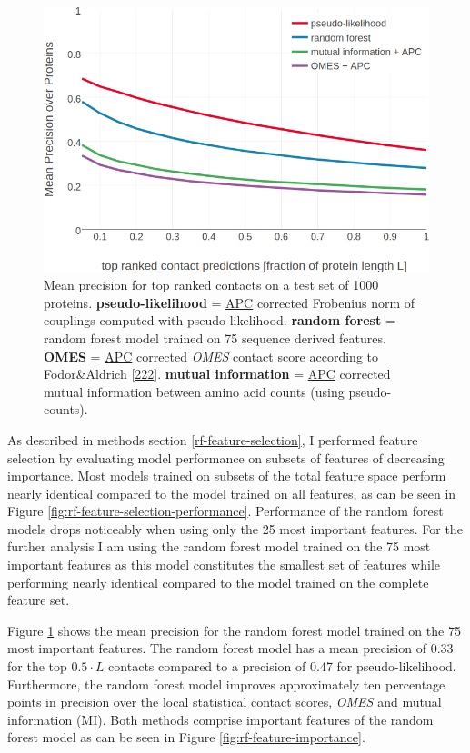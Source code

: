 \documentclass[11pt,a4paper,twoside]{book}
\theoremstyle{definition}
\theoremstyle{definition}
\theoremstyle{remark}
\begin{document}
\begin{figure}
\includegraphics[width=0.9\linewidth]{img/random_forest_contact_prior/precision_vs_rank_notitle} \caption{Mean precision for top ranked contacts on a
test set of 1000 proteins. \textbf{pseudo-likelihood} =
\protect\hyperlink{abbrev}{APC} corrected Frobenius norm of couplings
computed with pseudo-likelihood. \textbf{random forest} = random forest
model trained on 75 sequence derived features. \textbf{OMES} =
\protect\hyperlink{abbrev}{APC} corrected \emph{OMES} contact score
according to Fodor\&Aldrich
{[}\protect\hyperlink{ref-Fodor2004a}{222}{]}. \textbf{mutual
information} = \protect\hyperlink{abbrev}{APC} corrected mutual
information between amino acid counts (using pseudo-counts).}\label{fig:performance-rf}
\end{figure}

As described in methods section \ref{rf-feature-selection}, I performed
feature selection by evaluating model performance on subsets of features
of decreasing importance. Most models trained on subsets of the total
feature space perform nearly identical compared to the model trained on
all features, as can be seen in Figure
\ref{fig:rf-feature-selection-performance}. Performance of the random
forest models drops noticeably when using only the 25 most important
features. For the further analysis I am using the random forest model
trained on the 75 most important features as this model constitutes the
smallest set of features while performing nearly identical compared to
the model trained on the complete feature set.

Figure \ref{fig:performance-rf} shows the mean precision for the random
forest model trained on the 75 most important features. The random
forest model has a mean precision of 0.33 for the top \(0.5\cdot L\)
contacts compared to a precision of 0.47 for pseudo-likelihood.
Furthermore, the random forest model improves approximately ten
percentage points in precision over the local statistical contact
scores, \emph{OMES} and mutual information (MI). Both methods comprise
important features of the random forest model as can be seen in Figure
\ref{fig:rf-feature-importance}.
\end{document}
